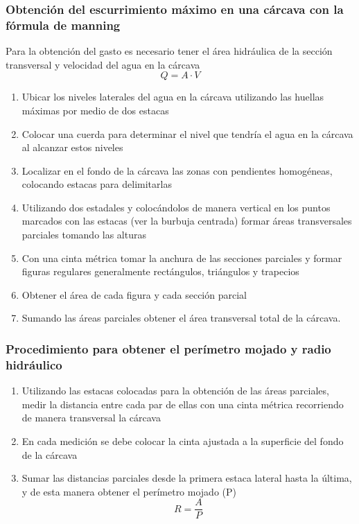    \subsubsection{Obtención del escurrimiento máximo en una cárcava con la fórmula de manning}
    Para la obtención del gasto es necesario tener el área hidráulica de la sección transversal y velocidad del agua en la cárcava
    \begin{equation}
        Q = A \cdot V
    \end{equation}
    \begin{enumerate}
        \item Ubicar los niveles laterales del agua en la cárcava utilizando las huellas máximas por medio de dos estacas
        \item Colocar una cuerda para determinar el nivel que tendría el agua en la cárcava al alcanzar estos niveles
        \item Localizar en el fondo de la cárcava las zonas con pendientes homogéneas, colocando estacas para delimitarlas
        \item Utilizando dos estadales y colocándolos de manera vertical en los puntos marcados con las estacas (ver la burbuja centrada) formar áreas transversales parciales tomando las alturas
        \item Con una cinta métrica tomar la anchura de las secciones parciales y formar figuras regulares generalmente rectángulos, triángulos y trapecios
        \item Obtener el área de cada figura y cada sección parcial
        \item Sumando las áreas parciales obtener el área transversal total de la cárcava.
    \end{enumerate}
    \subsubsection{Procedimiento para obtener el perímetro mojado y radio hidráulico}
    \begin{enumerate}
        \item Utilizando las estacas colocadas para la obtención de las áreas parciales, medir la distancia entre cada par de ellas con una cinta métrica recorriendo de manera transversal la cárcava
        \item En cada medición se debe colocar la cinta ajustada a la superficie del fondo de la cárcava
        \item Sumar las distancias parciales desde la primera estaca lateral hasta la última, y de esta manera obtener el perímetro mojado (P) \begin{equation}
            R = \frac{A}{P}
        \end{equation}
    \end{enumerate}
